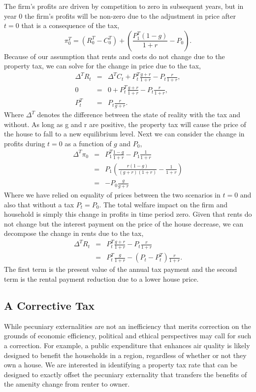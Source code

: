 \documentclass[ecta,nameyear,draft]{econsocart}
\theoremstyle{plain}
\theoremstyle{remark}
\begin{document}
The firm's profits are driven by competition to zero in subsequent years, but in year 0 the firm's profits will be non-zero due to the adjustment in price after $t=0$ that is a consequence of the tax,
\begin{equation}
	\pi^T_0 = (R^T_0-C^T_0)+\left(\frac{P^T_{1}(1-g)}{1+r}-P_0\right).\label{piT0}
\end{equation}
Because of our assumption that rents and costs do not change due to the property tax, we can solve for the change in price due to the tax,
\begin{eqnarray*}
	\Delta^T R_t&=&\Delta^T C_t+P^T_{t}\frac{g+r}{1+r}-P_{t} \frac{r}{1+r},\\
	0&=&0+P^T_{t}\frac{g+r}{1+r}-P_{t} \frac{r}{1+r},\\
	P^T_t&=& P_t\frac{r}{g+r}.
\end{eqnarray*}
Where $\Delta^T$ denotes the difference between the state of reality with the tax and without. As long as g and r are positive, the property tax will cause the price of the house to fall to a new equilibrium level.
Next we can consider the change in profits during $t=0$ as a function of $g$ and $P_0$,
\begin{eqnarray*}
	\Delta^T \pi_0 &=& P_1^T\frac{1-g}{1+r}-P_1\frac{1}{1+r}\\
	&=& P_1\left(\frac{r(1-g)}{(g+r)(1+r)}-\frac{1}{1+r}\right)\\
	&=&-P_0\frac{g}{g+r}
\end{eqnarray*}
Where we have relied on equality of prices between the two scenarios in $t=0$ and also that without a tax $P_t=P_0$. The total welfare impact on the firm and household is simply this change in profits in time period zero.
Given that rents do not change but the interest payment on the price of the house decrease, we can decompose the change in rents due to the tax,
\begin{eqnarray*}
	\Delta^T R_t&=&P^T_t\frac{g+r}{1+r}-P_t\frac{r}{1+r}\\
	&=&P^T_t\frac{g}{1+r}-(P_t-P_t^T)\frac{r}{1+r}.
\end{eqnarray*}
The first term is the present value of the annual tax payment and the second term is the rental payment reduction due to a lower house price. 
\subsection{A Corrective Tax}
While pecuniary externalities are not an inefficiency that merits correction on the grounds of economic efficiency, political and ethical perspectives may call for such a correction. For example, a public expenditure that enhances air quality is likely designed to benefit the households in a region, regardless of whether or not they own a house. We are interested in identifying a property tax rate that can be designed to exactly offset the pecuniary externality that transfers the benefits of the amenity change from renter to owner.
\end{document}
